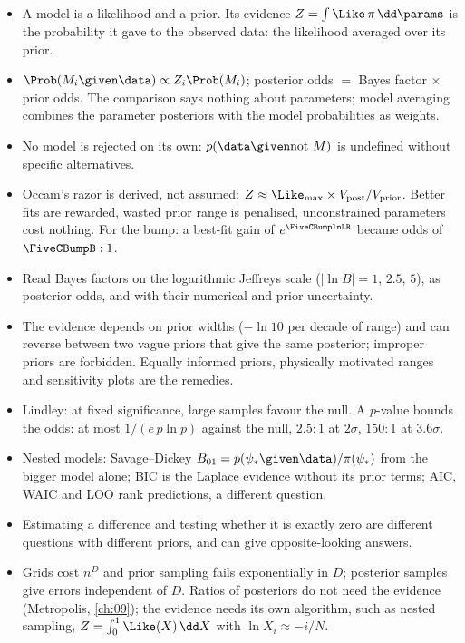 \begin{recap}
\begin{itemize}[itemsep=2pt,leftmargin=1.2em]
  \item A model is a likelihood and a prior. Its evidence $Z=\int\Like\,\pi\,\dd\params$ is
        the probability it gave to the observed data: the likelihood averaged over its
        prior.
  \item $\Prob(M_i\given\data)\propto Z_i\Prob(M_i)$; posterior odds $=$ Bayes factor
        $\times$ prior odds. The comparison says nothing about parameters; model averaging
        combines the parameter posteriors with the model probabilities as weights.
  \item No model is rejected on its own: $p(\data\given\text{not }M)$ is undefined without
        specific alternatives.
  \item Occam's razor is derived, not assumed: $Z\approx\Like_{\max}\times V_{\rm post}/V_{\rm prior}$.
        Better fits are rewarded, wasted prior range is penalised, unconstrained parameters
        cost nothing. For the bump: a best-fit gain of $e^{\FiveCBumplnLR}$ became odds of $\FiveCBumpB:1$.
  \item Read Bayes factors on the logarithmic Jeffreys scale ($\lvert\ln B\rvert=1$, $2.5$,
        $5$), as posterior odds, and with their numerical and prior uncertainty.
  \item The evidence depends on prior widths ($-\ln10$ per decade of range) and can reverse
        between two vague priors that give the same posterior; improper priors are
        forbidden. Equally informed priors, physically motivated ranges and sensitivity
        plots are the remedies.
  \item Lindley: at fixed significance, large samples favour the null. A $p$-value bounds the
        odds: at most $1/(e\,p\ln p)$ against the null, $2.5:1$ at $2\sigma$, $150:1$ at
        $3.6\sigma$.
  \item Nested models: Savage--Dickey $B_{01}=p(\psi_*\given\data)/\pi(\psi_*)$ from the bigger
        model alone; BIC is the Laplace evidence without its prior terms; AIC, WAIC and LOO
        rank predictions, a different question.
  \item Estimating a difference and testing whether it is exactly zero are different
        questions with different priors, and can give opposite-looking answers.
  \item Grids cost $n^D$ and prior sampling fails exponentially in $D$; posterior samples
        give errors independent of $D$. Ratios of posteriors do not need the evidence
        (Metropolis, \cref{ch:09}); the evidence needs its own algorithm, such as nested
        sampling, $Z=\int_0^1\Like(X)\,\dd X$ with $\ln X_i\approx-i/N$.
\end{itemize}
\end{recap}

